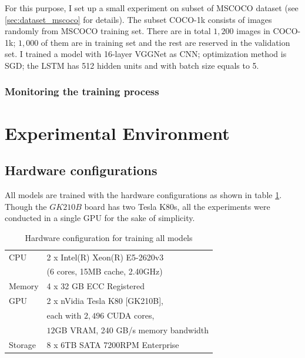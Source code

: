 	For this purpose, I set up a small experiment on subset of MSCOCO dataset (see \ref{sec:dataset_mscoco} for details). The subset COCO-1k consists of images randomly from MSCOCO training set. There are in total $1,200$ images in COCO-1k; $1,000$ of them are in training set and the rest are reserved in the validation set. I trained a model with 16-layer VGGNet as CNN; optimization method is SGD; the LSTM has 512 hidden units and with batch size equals to 5.

	\subsubsection{Monitoring the training process}
	\label{sec:monitoring}

\section{Experimental Environment}
\label{sec:chap4_environment}

\subsection{Hardware configurations}
\label{sec:hardware}
All models are trained with the hardware configurations as shown in table \ref{tab:hardware_configuration}. Though the $GK210B$ board has two Tesla K80s, all the experiments were conducted in a single GPU for the sake of simplicity.

\begin{table}
	\centering
	\caption{Hardware configuration for training all models}	
	\label{tab:hardware_configuration}
	\begin{tabularx}{0.65\textwidth}{ll}
		\toprule
		CPU & 2 x Intel(R) Xeon(R) E5-2620v3 \\
			& (6 cores, 15MB cache, 2.40GHz) \\
		\midrule
		Memory & 4 x 32 GB ECC Registered \\
		\midrule 
		GPU & 2 x nVidia Tesla K80 [GK210B], \\
			& each with $2,496$ CUDA cores, \\
			& $12$GB VRAM, 240 GB/s memory bandwidth \\
		\midrule
		Storage & 8 x 6TB SATA 7200RPM Enterprise \\
		\bottomrule
	\end{tabularx}
\end{table}

